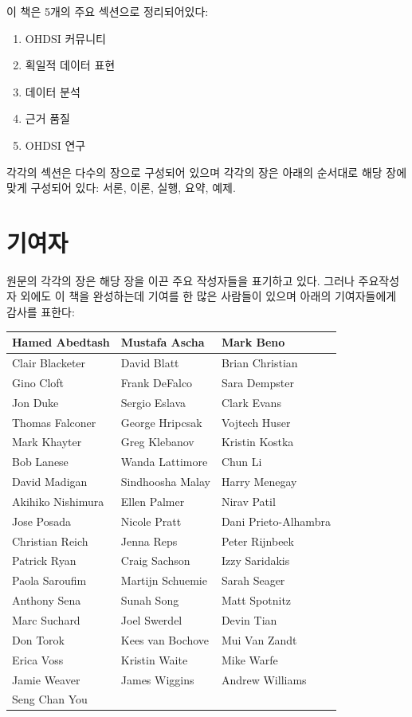 \documentclass[11pt]{book}
\providecommand{\tightlist}{%
  \setlength{\itemsep}{0pt}\setlength{\parskip}{0pt}}
\theoremstyle{definition}
\theoremstyle{definition}
\theoremstyle{definition}
\theoremstyle{remark}
\begin{document}
이 책은 5개의 주요 섹션으로 정리되어있다:

\begin{enumerate}
\def\labelenumi{\Roman{enumi})}
\tightlist
\item
  OHDSI 커뮤니티
\item
  획일적 데이터 표현
\item
  데이터 분석
\item
  근거 품질
\item
  OHDSI 연구
\end{enumerate}

각각의 섹션은 다수의 장으로 구성되어 있으며 각각의 장은 아래의 순서대로
해당 장에 맞게 구성되어 있다: 서론, 이론, 실행, 요약, 예제.

\section*{기여자}

원문의 각각의 장은 해당 장을 이끈 주요 작성자들을 표기하고 있다. 그러나
주요작성자 외에도 이 책을 완성하는데 기여를 한 많은 사람들이 있으며
아래의 기여자들에게 감사를 표한다:

\begin{tabular}{l|l|l}
\hline
Hamed Abedtash & Mustafa Ascha & Mark Beno\\
\hline
Clair Blacketer & David Blatt & Brian Christian\\
\hline
Gino Cloft & Frank DeFalco & Sara Dempster\\
\hline
Jon Duke & Sergio Eslava & Clark Evans\\
\hline
Thomas Falconer & George Hripcsak & Vojtech Huser\\
\hline
Mark Khayter & Greg Klebanov & Kristin Kostka\\
\hline
Bob Lanese & Wanda Lattimore & Chun Li\\
\hline
David Madigan & Sindhoosha Malay & Harry Menegay\\
\hline
Akihiko Nishimura & Ellen Palmer & Nirav Patil\\
\hline
Jose Posada & Nicole Pratt & Dani Prieto-Alhambra\\
\hline
Christian Reich & Jenna Reps & Peter Rijnbeek\\
\hline
Patrick Ryan & Craig Sachson & Izzy Saridakis\\
\hline
Paola Saroufim & Martijn Schuemie & Sarah Seager\\
\hline
Anthony Sena & Sunah Song & Matt Spotnitz\\
\hline
Marc Suchard & Joel Swerdel & Devin Tian\\
\hline
Don Torok & Kees van Bochove & Mui Van Zandt\\
\hline
Erica Voss & Kristin Waite & Mike Warfe\\
\hline
Jamie Weaver & James Wiggins & Andrew Williams\\
\hline
Seng Chan You &  & \\
\hline
\end{tabular}
\end{document}
